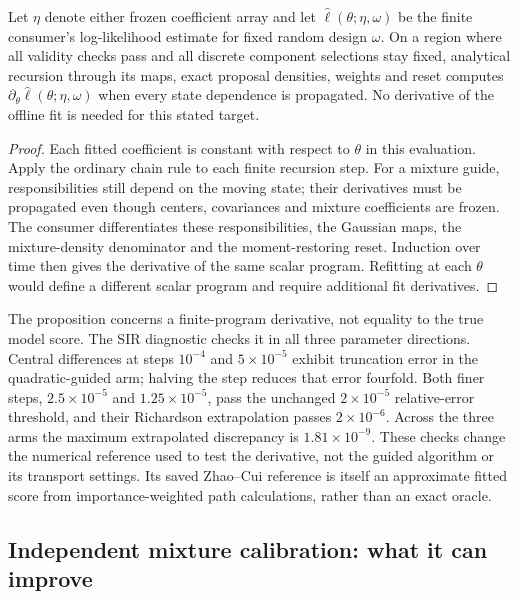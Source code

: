 \begin{proposition}
\label{prop:bg-sir-frozen-derivative}
Let $\eta$ denote either frozen coefficient array and let
$\widehat\ell(\theta;\eta,\omega)$ be the finite consumer's log-likelihood
estimate for fixed random design $\omega$. On a region where all validity
checks pass and all discrete component selections stay fixed, analytical
recursion through its maps, exact proposal densities, weights and reset
computes $\partial_\theta\widehat\ell(\theta;\eta,\omega)$ when every
state dependence is propagated. No derivative of the offline fit is needed
for this stated target.
\end{proposition}
\begin{proof}
Each fitted coefficient is constant with respect to $\theta$ in this
evaluation. Apply the ordinary chain rule to each finite recursion step.
For a mixture guide, responsibilities still depend on the moving state;
their derivatives must be propagated even though centers, covariances and
mixture coefficients are frozen. The consumer differentiates these
responsibilities, the Gaussian maps, the mixture-density denominator and
the moment-restoring reset. Induction over time then gives the derivative
of the same scalar program. Refitting at each $\theta$ would define a
different scalar program and require additional fit derivatives.
\end{proof}

The proposition concerns a finite-program derivative, not equality to the
true model score. The SIR diagnostic checks it in all three parameter
directions. Central differences at steps $10^{-4}$ and $5\times10^{-5}$
exhibit truncation error in the quadratic-guided arm; halving the step
reduces that error fourfold. Both finer steps, $2.5\times10^{-5}$ and
$1.25\times10^{-5}$, pass the unchanged $2\times10^{-5}$ relative-error
threshold, and their Richardson extrapolation passes $2\times10^{-6}$.
Across the three arms the maximum extrapolated discrepancy is
$1.81\times10^{-9}$. These checks change the numerical reference used
to test the derivative, not the guided algorithm or its transport settings.
Its saved Zhao--Cui reference is itself an approximate fitted score from
importance-weighted path calculations, rather than an exact oracle.

\subsection{Independent mixture calibration: what it can improve}
\label{sec:bg-sir-beta-calibration}

